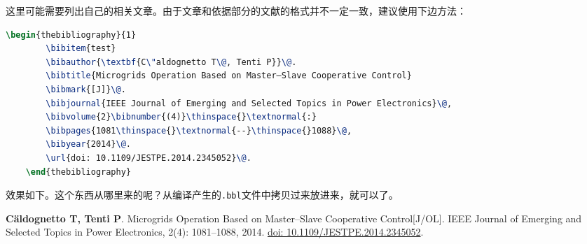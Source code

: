 

这里可能需要列出自己的相关文章。由于文章和依据部分的文献的格式并不一定一致，建议使用下边方法：
\begin{lstlisting}[language=tex, basicstyle=\ttfamily\tiny, keywordstyle=\color{blue}, commentstyle=\color{gray}]
	\begin{thebibliography}{1}
		\bibitem{test}
		\bibauthor{\textbf{C\"aldognetto T\@, Tenti P}}\@. 
		\bibtitle{Microgrids Operation Based on Master–Slave Cooperative Control}
		\bibmark{[J]}\@.
		\bibjournal{IEEE Journal of Emerging and Selected Topics in Power Electronics}\@,
		\bibvolume{2}\bibnumber{(4)}\thinspace{}\textnormal{:}
		\bibpages{1081\thinspace{}\textnormal{--}\thinspace{}1088}\@,
		\bibyear{2014}\@.
		\url{doi: 10.1109/JESTPE.2014.2345052}\@.
	\end{thebibliography}
\end{lstlisting}
效果如下。这个东西从哪里来的呢？从编译产生的\verb|.bbl|文件中拷贝过来放进来，就可以了。
\vspace{-50pt}
\begin{thebibliography}{1}
	\providecommand{\bibauthor}[1]{#1}
	\providecommand{\bibeditor}[1]{#1}
	\providecommand{\bibtranslator}[1]{#1}
	\providecommand{\bibtitle}[1]{#1}
	\providecommand{\bibbooktitle}[1]{#1}
	\providecommand{\bibjournal}[1]{#1}
	\providecommand{\bibmark}[1]{#1}
	\providecommand{\bibcountry}[1]{#1}
	\providecommand{\bibpatentid}[1]{#1}
	\providecommand{\bibedition}[1]{#1}
	\providecommand{\biborganization}[1]{#1}
	\providecommand{\bibaddress}[1]{#1}
	\providecommand{\bibpublisher}[1]{#1}
	\providecommand{\bibinstitution}[1]{#1}
	\providecommand{\bibschool}[1]{#1}
	\providecommand{\bibvolume}[1]{#1}
	\providecommand{\bibnumber}[1]{#1}
	\providecommand{\bibversion}[1]{#1}
	\providecommand{\bibpages}[1]{#1}
	\providecommand{\bibmodifydate}[1]{#1}
	\providecommand{\bibcitedate}[1]{#1}
	\providecommand{\bibyear}[1]{#1}
	\providecommand{\bibdate}[1]{#1}
	\providecommand{\biburl}[1]{\newline\url{#1}}
	\bibauthor{\textbf{C\"aldognetto T\@, Tenti P}}\@. \bibtitle{Microgrids Operation Based
		on Master–Slave Cooperative Control}\bibmark{[J/OL]}\@. \bibjournal{IEEE
		Journal of Emerging and Selected Topics in Power Electronics}\@,
	\bibvolume{2}\bibnumber{(4)}\thinspace{}\textnormal{:
	}\bibpages{1081\thinspace{}\textnormal{--}\thinspace{}1088}\@,
	\bibyear{2014}\@. \url{doi: 10.1109/JESTPE.2014.2345052}\@.
\end{thebibliography}